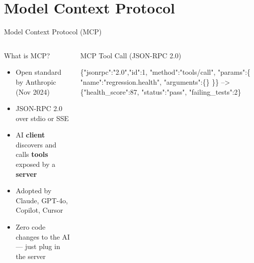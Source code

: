 \documentclass[aspectratio=169,t]{beamer}
\begin{document}
\section{Model Context Protocol}
\begin{frame}[fragile]{Model Context Protocol (MCP)}
  \begin{columns}[T]
      \begin{block}{What is MCP?}
        \small
        \begin{itemize}
          \item Open standard by Anthropic (Nov 2024)
          \item JSON-RPC 2.0 over stdio or SSE
          \item AI \textbf{client} discovers and calls \textbf{tools}
                exposed by a \textbf{server}
          \item Adopted by Claude, GPT-4o, Copilot, Cursor
          \item Zero code changes to the AI — just plug in the server
        \end{itemize}
      \end{block}

      \vspace{0.3em}
      \begin{exampleblock}{MCP Tool Call (JSON-RPC 2.0)}
        \footnotesize
\begin{semiverbatim}\color{white}
\{"jsonrpc":"2.0","id":1,
 "method":"tools/call",
 "params":\{
   "name":"regression.health",
   "arguments":\{\}
 \}\}
--> \{"health_score":87,
     "status":"pass",
     "failing_tests":2\}
\end{semiverbatim}
      \end{exampleblock}


\end{columns}
\end{frame}
\end{document}
